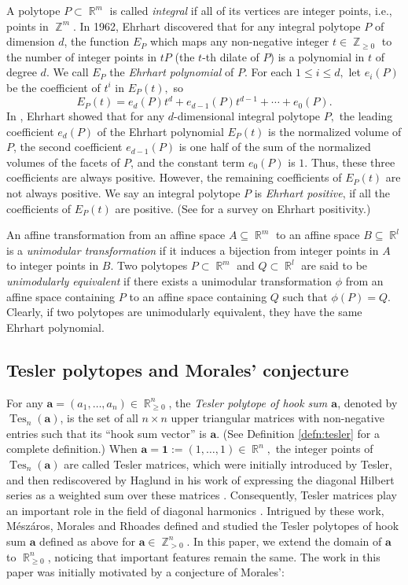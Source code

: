 \documentclass[12pt]{amsart}
\numberwithin{equation}{section}
\theoremstyle{definition}
\def\tes{\operatorname{Tes}}
\def\ba{{\boldsymbol{a}}}
\def\Z{\operatorname{\mathbb{Z}}}
\def\R{\operatorname{\mathbb{R}}}
\begin{document}
A polytope $P \subset \R^{m}$ is called \emph{integral} if all of its vertices are integer points, i.e., points in $\Z^m$. In 1962, Ehrhart discovered that for any integral polytope $P$ of dimension $d$, the function $E_{P}$ which maps any non-negative integer $t \in \Z_{\geq 0}$ to the number of integer points in $tP$ (the $t$-th dilate of $P$) is a polynomial in $t$ of degree $d$. We call $E_{P}$ the \emph{Ehrhart polynomial} of $P$. For each $1 \le i \le d,$ let $e_i(P)$ be the coefficient of $t^i$ in $E_P(t),$ so 
\[E_P(t)=e_{d}(P)t^{d}+e_{d-1}(P)t^{d-1}+\cdots+ e_0(P).\]
In \cite{ehrhart1967probleme}, Ehrhart showed that for any $d$-dimensional integral polytope $P,$ the leading coefficient $e_{d}(P)$ of the Ehrhart polynomial $E_P(t)$ is the normalized volume of $P$, the second coefficient $e_{d-1}(P)$ is one half of the sum of the normalized volumes of the facets of $P$, and the constant term $e_0(P)$ is $1$. Thus, these three coefficients are always positive. However, the remaining coefficients of $E_P(t)$ are not always positive. We say an integral polytope $P$ is \emph{Ehrhart positive}, if all the coefficients of $E_P(t)$ are positive. (See \cite{liu2019positivity} for a survey on Ehrhart positivity.)

An affine transformation from an affine space $A \subseteq \R^{m}$ to an affine space $B \subseteq \R^{l}$ is a \emph{unimodular transformation} if it induces a bijection from integer points in $A$ to integer points in $B$. Two polytopes $P \subset \R^{m}$ and $Q \subset \R^{l}$ are said to be \emph{unimodularly equivalent} if there exists a unimodular transformation $\phi$ from 
an affine space containing $P$ to an affine space containing $Q$ such that $\phi(P)=Q$. Clearly, if two polytopes are unimodularly equivalent, they have the same Ehrhart polynomial.

\subsection{Tesler polytopes and Morales' conjecture} 

For any $\ba=(a_1,\dots,a_n) \in \R_{\geq 0}^{n}$, the \emph{Tesler polytope of hook sum $\ba$}, denoted by $\tes_{n}(\ba)$, is the set of all $n \times n$ upper triangular matrices with non-negative entries such that its ``hook sum vector'' is $\ba.$ (See Definition \ref{defn:tesler} for a complete definition.)
When $\ba = \boldsymbol{1}:=(1,\dots,1) \in \R^n,$ the integer points of $\tes_{n}(\ba)$ are called Tesler matrices, which were initially introduced by Tesler,
and then rediscovered by Haglund in his work of expressing the diagonal Hilbert series as a weighted sum over these matrices \cite{haglund2011polynomial}. Consequently, Tesler matrices play an important role in the field of diagonal harmonics \cite{armstrong2012combinatorics, garsia2014constant, gorsky2015refined, haglund2018delta, wilson2017weighted}.
Intrigued by these work, M\'{e}sz\'{a}ros, Morales and Rhoades \cite{Meszaros2017} defined and studied the Tesler polytopes of hook sum $\ba$ defined as above for $\ba \in \Z_{>0}^n$. In this paper, we extend the domain of $\ba$ to $\R_{\geq 0}^{n}$, noticing that important features remain the same.
The work in this paper was initially motivated by a conjecture of Morales':
\end{document}
